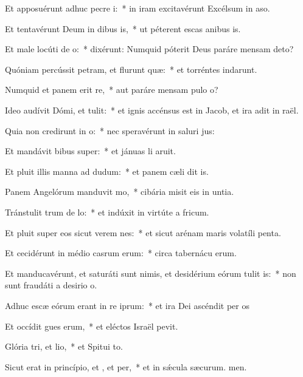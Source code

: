 \item Et apposuérunt adhuc pecre i:~* in iram excitavérunt Excélsum in aso.
\item Et tentavérunt Deum in dibus is,~* ut péterent escas anibus is.
\item Et male locúti  de o:~* dixérunt: Numquid póterit Deus paráre mensam  deto?
\item Quóniam percússit petram, et flurunt quæ:~* et torréntes indarunt.
\item Numquid et panem erit re,~* aut paráre mensam pulo o?
\item Ideo audívit Dómi, et tulit:~* et ignis accénsus est in Jacob, et ira adit in raël.
\item Quia non credirunt in o:~* nec speravérunt in saluri jus:
\item Et mandávit bibus super:~* et jánuas li aruit.
\item Et pluit illis manna ad dudum:~* et panem cæli dit is.
\item Panem Angelórum manduvit mo,~* cibária misit eis in untia.
\item Tránstulit trum de lo:~* et indúxit in virtúte a fricum.
\item Et pluit super eos sicut verem nes:~* et sicut arénam maris volatíli penta.
\item Et cecidérunt in médio casrum erum:~* circa tabernácu erum.
\item Et manducavérunt, et saturáti sunt nimis, et desidérium eórum tulit is:~* non sunt fraudáti a desirio o.
\item Adhuc escæ eórum erant in re iprum:~* et ira Dei ascéndit per os
\item Et occídit gues erum,~* et eléctos Israël pevit.
\item Glória tri, et lio,~* et Spitui to.
\item Sicut erat in princípio, et , et per,~* et in sǽcula sæcurum. men.
